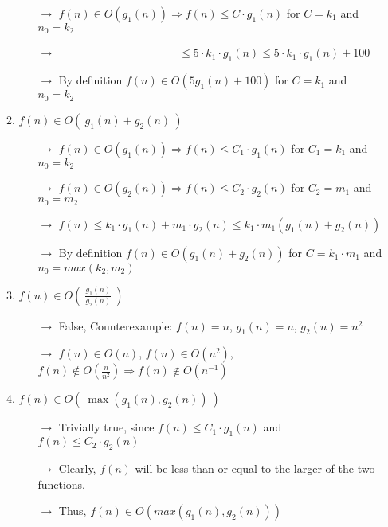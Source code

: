 \documentclass[12pt]{elsart}
\begin{document}
\begin{enumerate}
\begin{enumerate}
		\begin{itemize}
		\item[$\rightarrow$] $f(n)\in O(g_1(n)) \Rightarrow f(n) \leq C \cdot g_1(n)$ for $C = k_1$ and $n_0 = k_2$
		\item[$\rightarrow$] \verb!                     !$\leq 5 \cdot k_1 \cdot g_1(n) \leq 5 \cdot k_1 \cdot g_1(n) + 100$
		\item[$\rightarrow$] By definition $f(n)\in O(5g_1(n) + 100)$ for $C = k_1$ and $n_0 = k_2$
		\end{itemize}
   \item $f(n)\in O( \ g_1(n)+g_2(n)\ )$
		\begin{itemize}
		\item[$\rightarrow$] $f(n)\in O(g_1(n)) \Rightarrow f(n) \leq C_1 \cdot g_1(n)$ for $C_1 = k_1$ and $n_0 = k_2$
		\item[$\rightarrow$] $f(n)\in O(g_2(n)) \Rightarrow f(n) \leq C_2 \cdot g_2(n)$ for $C_2 = m_1$ and $n_0 = m_2$
		\item[$\rightarrow$] $f(n) \leq k_1 \cdot g_1(n) + m_1 \cdot g_2(n) \leq k_1 \cdot m_1(g_1(n) + g_2(n))$
		\item[$\rightarrow$] By definition $f(n)\in O(g_1(n) + g_2(n))$ for $C = k_1 \cdot m_1$ and $n_0 = max(k_2, m_2)$
		\end{itemize}
   \item $f(n)\in O( \ \frac{g_1(n)}{g_2(n)}\ )$
		\begin{itemize}
		\item[$\rightarrow$] False, Counterexample: $f(n) = n$, $g_1(n) = n$, $g_2(n) = n^2$
		\item[$\rightarrow$] $f(n)\in O(n)$, $f(n)\in O(n^2)$, $f(n)\notin O(\frac{n}{n^2}) \Rightarrow f(n)\notin O(n^{-1})$
		\end{itemize}
   \item $f(n)\in O( \ \max(g_1(n), g_2(n))\ )$
		\begin{itemize}
		\item[$\rightarrow$] Trivially true, since $f(n) \leq C_1 \cdot g_1(n)$ and $f(n) \leq C_2 \cdot g_2(n)$
		\item[$\rightarrow$] Clearly, $f(n)$ will be less than or equal to the larger of the two functions.
		\item[$\rightarrow$] Thus, $f(n)\in O(max(g_1(n), g_2(n)))$
		\end{itemize}
\end{enumerate}
\end{enumerate}
\end{document}
